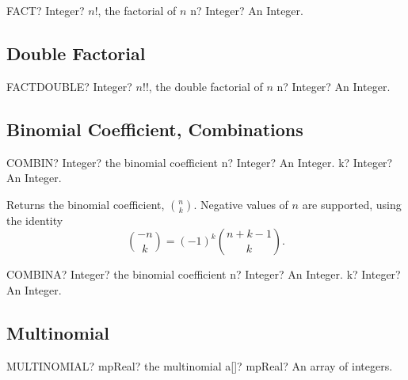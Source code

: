 \vspace{0.6cm}
\begin{mpFunctionsExtract}
	\mpWorksheetFunctionOneNotImplemented
	{FACT? Integer?  $n!$, the factorial of $n$}
	{n? Integer? An Integer.}
\end{mpFunctionsExtract}



\subsection{Double Factorial}

\begin{mpFunctionsExtract}
	\mpWorksheetFunctionOneNotImplemented
	{FACTDOUBLE? Integer?  $n!!$, the double factorial of $n$}
	{n? Integer? An Integer.}
\end{mpFunctionsExtract}




\subsection{Binomial Coefficient, Combinations}


\vspace{0.6cm}
\begin{mpFunctionsExtract}
	\mpWorksheetFunctionTwoNotImplemented
	{COMBIN? Integer? the binomial coefficient}
	{n? Integer? An Integer.}
	{k? Integer? An Integer.}
\end{mpFunctionsExtract}

\vspace{0.3cm}
Returns the binomial coefficient, $\binom{n}{k}$. Negative values of $n$ are supported, using the identity
\begin{equation}
	\binom{-n}{k} = (-1)^k \binom{n+k-1}{k}.
\end{equation}


\vspace{0.6cm}
\begin{mpFunctionsExtract}
	\mpWorksheetFunctionTwoNotImplemented
	{COMBINA? Integer? the binomial coefficient}
	{n? Integer? An Integer.}
	{k? Integer? An Integer.}
\end{mpFunctionsExtract}




\subsection{Multinomial}

\begin{mpFunctionsExtract}
	\mpWorksheetFunctionOneNotImplemented
	{MULTINOMIAL? mpReal? the multinomial}
	{a[]? mpReal? An array of integers.}
\end{mpFunctionsExtract}

